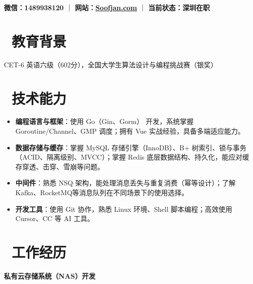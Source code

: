 \documentclass{resume}
\begin{document}


\begin{center}
\textbf{微信：1489938120} ｜ 
\textbf{网站：\href{https://Soofjan.com}{Soofjan.com}} ｜
\textbf{当前状态：深圳在职} 
\end{center}

\section{\faGraduationCap\ 教育背景}
CET-6 英语六级（602分），全国大学生算法设计与编程挑战赛（银奖） 

\section{\faCogs\ 技术能力}
\begin{itemize}[parsep=0.3ex]
    \item \textbf{编程语言与框架}：使用 Go（Gin、Gorm） 开发，系统掌握 Goroutine/Channel、GMP 调度；拥有 Vue 实战经验，具备多端适应能力。
    \item \textbf{数据存储与缓存}：掌握 MySQL 存储引擎（InnoDB）、B+ 树索引、锁与事务（ACID、隔离级别、MVCC）；掌握 Redis 底层数据结构、持久化，能应对缓存穿透、击穿、雪崩等问题。
    \item \textbf{中间件}：熟悉 NSQ 架构，能处理消息丢失与重复消费（幂等设计）；了解Kafka、RocketMQ等消息队列在不同场景下的使用选择。
    \item \textbf{开发工具}：使用 Git 协作，熟悉 Linux 环境、Shell 脚本编程；高效使用 Cursor、CC 等 AI 工具。
  
\end{itemize}

\section{\faSuitcase\ 工作经历}

\paragraph*{私有云存储系统（NAS）开发}
\end{document}
